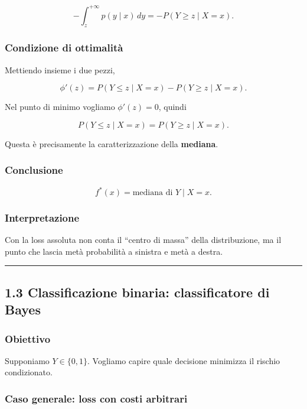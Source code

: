\documentclass[
]{article}
\begin{document}
\[
-\int_{z}^{+\infty}p(y\mid x)\,dy = -P(Y\ge z\mid X=x).
\]

\subsubsection{Condizione di
ottimalità}\label{condizione-di-ottimalituxe0}

Mettiendo insieme i due pezzi,

\[
\phi'(z)=P(Y\le z\mid X=x)-P(Y\ge z\mid X=x).
\]

Nel punto di minimo vogliamo \(\phi'(z)=0\), quindi

\[
P(Y\le z\mid X=x)=P(Y\ge z\mid X=x).
\]

Questa è precisamente la caratterizzazione della \textbf{mediana}.

\subsubsection{Conclusione}\label{conclusione-1}

\[
f^*(x)=\text{mediana di }Y\mid X=x.
\]

\subsubsection{Interpretazione}\label{interpretazione-1}

Con la loss assoluta non conta il ``centro di massa'' della
distribuzione, ma il punto che lascia metà probabilità a sinistra e metà
a destra.

\begin{center}\rule{0.5\linewidth}{0.5pt}\end{center}

\subsection{1.3 Classificazione binaria: classificatore di
Bayes}\label{classificazione-binaria-classificatore-di-bayes}

\subsubsection{Obiettivo}\label{obiettivo-2}

Supponiamo \(Y\in\{0,1\}\). Vogliamo capire quale decisione minimizza il
rischio condizionato.

\subsubsection{Caso generale: loss con costi
arbitrari}\label{caso-generale-loss-con-costi-arbitrari}
\end{document}
